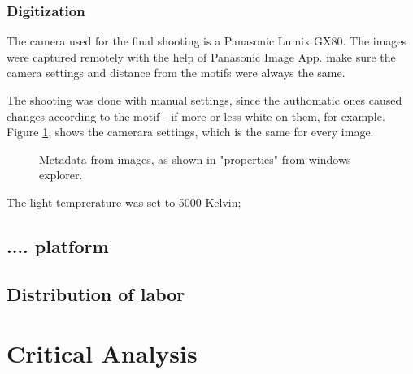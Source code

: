 \documentclass[12 pt]{paper}
\begin{document}
\subsubsection{Digitization}

  The camera used for the final shooting is a Panasonic Lumix GX80. The images were captured remotely with the help of Panasonic Image App. make sure the camera settings and distance from the motifs were always the same. 
  
  The shooting was done with manual settings, since the authomatic ones caused changes according to the motif - if more or less white on them, for example. Figure \ref{tekniskMetatada}, shows the camerara settings, which is the same for every image.
  
  
  \begin{figure}[!htb]
  	\centering
  	\caption[short:]{Metadata from images, as shown in "properties" from windows explorer.}
  	\label{tekniskMetatada}
  \end{figure}
  
 The light temprerature was set to 5000 Kelvin;
 
 

\subsection{.... platform}%


\subsection{Distribution of labor}

\begin{table}
	
	\caption{}
\end{table}
\section {Critical Analysis}
\end{document}
